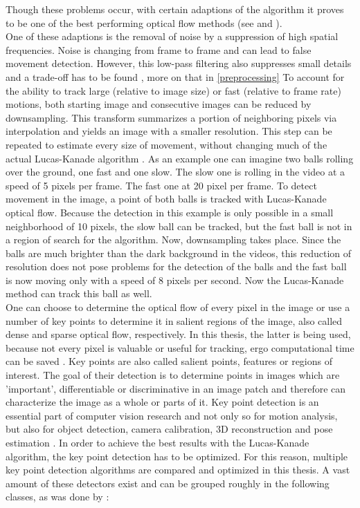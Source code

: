 \documentclass[Bachelorarbeit.tex]{subfiles}
\begin{document}
Though these problems occur, with certain adaptions of the algorithm it proves to be one of the best performing optical flow methods (see \cite{galvin1998recovering} and \cite{barron1992performance}).
\\One of these adaptions is the removal of noise by a suppression of high spatial frequencies. Noise is changing from frame to frame and can lead to false movement detection.
However, this low-pass filtering also suppresses small details and a trade-off has to be found \citep[p. 123]{lucas1981iterative}, more on that in \autoref{preprocessing}
To account for the ability to track large (relative to image size) or fast (relative to frame rate) motions, both starting image and consecutive images can be reduced by downsampling. This transform summarizes a portion of neighboring pixels via interpolation and yields an image with a smaller resolution. This step can be repeated to estimate every size of movement, without changing much of the actual Lucas-Kanade algorithm \cite{bouguet2001pyramidal}. As an example one can imagine two balls rolling over the ground, one fast and one slow. The slow one is rolling in the video at a speed of 5 pixels per frame. The fast one at 20 pixel per frame. To detect movement in the image, a point of both balls is tracked with Lucas-Kanade optical flow. Because the detection in this example is only possible in a small neighborhood of 10 pixels, the slow ball can be tracked, but the fast ball is not in a region of search for the algorithm. Now, downsampling takes place. Since the balls are much brighter than the dark background in the videos, this reduction of resolution does not pose problems for the detection of the balls and the fast ball is now moving only with a speed of 8 pixels per second. Now the Lucas-Kanade method can track this ball as well.\\
One can choose to determine the optical flow of every pixel in the image or use a number of key points to determine it in salient regions of the image, also called dense and sparse optical flow, respectively. In this thesis, the latter is being used, because not every pixel is valuable or useful for tracking, ergo computational time can be saved \citep{shi1993good}. Key points are also called salient points, features or regions of interest. The goal of their detection is to determine points in images which are 'important', differentiable or discriminative in an image patch and therefore can characterize the image as a whole or parts of it. Key point detection is an essential part of computer vision research and not only so for motion analysis, but also for object detection, camera calibration, 3D reconstruction and pose estimation \citep[p. 179]{tuytelaars2008local}. In order to achieve the best results with the Lucas-Kanade algorithm, the key point detection has to be optimized. For this reason, multiple key point detection algorithms are compared and optimized in this thesis. A vast amount of these detectors exist and can be grouped roughly in the following classes, as was done by \cite[pp. 337]{gauglitz2011evaluation}:\\ 
\end{document}
